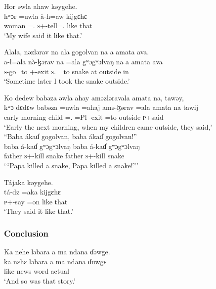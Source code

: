 \ea Hor  əwla  ahaw  kəygehe.\\
\gll hʷɔr   =uwla     à-h=aw kijgɛhɛ\\
woman  ={\oneS}.{\POSS}    \textsc{s}+{\PFV}-tell={\oneS}.{\IO}     {like that}\\
\glt ‘My wife said it like that.’
\z

\ea  Alala,  nəzlərav  na ala  gogolvan  na   a  amata  ava. \\
\gll a-l=ala    n\`ə-ɮərav         na       =ala  gʷɔgʷɔlvaŋ  na  a  amata  ava\\
\textsc{s}-go=to  {\oneS}+{\PFV}-exit  \textsc{s}.{\DO}   =to  snake        {\PSP}    at   outside  in\\
\glt ‘Sometime later I took the snake outside.’ 
\z

\ea Ko  dedew  babəza  əwla  ahay  aməzləravala  amata  na, tawəy,\\
\gll kʷɔ     dɛdɛw     babəza  =uwla       =ahaj  amə-ɮərav =ala  amata      na    tawij\\
early   morning  child      ={\oneS}.{\POSS}   =Pl  {\NOM}{}-exit  =to     outside   {\PSP}    \textsc{p}+said\\
\glt ‘Early the next morning, when my children came outside, they said,’\\

\largerpage[2]
\medskip
 “Baba  ákaɗ  gogolvan,  baba   ákaɗ  gogolvan!”\\
\gll baba     á-kaɗ gʷɔgʷɔlvaŋ  baba   á-kaɗ gʷɔgʷɔlvaŋ\\
father   \textsc{s}+{\IFV}-kill      snake    father   \textsc{s}+{\IFV}-kill      snake\\
\glt  ‘“Papa killed a snake, Papa killed a snake!”’
\z

\ea Tájaka  kəygehe.\\
\gll tá-dz          =aka   kijgɛhɛ\\
\textsc{p}+{\IFV}-say  =on  {like that}\\
\glt ‘They said it like that.’
\z

\subsubsection*{Conclusion}
\ea Ka  nehe  ləbara  a  ma  ndana  ɗəwge.\\
\gll ka  nɛhɛ  ləbara  a       ma      ndana  ɗuwgɛ\\
like  {\DEM}  news    {\GEN}  word  {\DEM}      actual\\
\glt ‘And so was that story.’
\z

